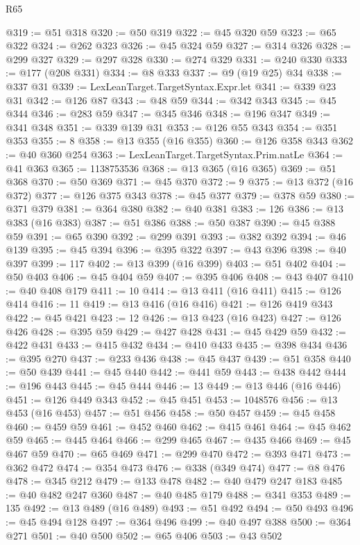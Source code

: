 \begin{lexlean}{R65}
\begin{coremodule}
@319 := @51 @318
@320 := @50 @319
@322 := @45 @320 @59
@323 := @65 @322
@324 := @262 @323
@326 := @45 @324 @59
@327 := @314 @326
@328 := @299 @327
@329 := @297 @328
@330 := @274 @329
@331 := @240 @330
@333 := @177 (@208 @331)
@334 := @8 @333
@337 := @9 (@19 @25) @34
@338 := @337 @31
@339 := LexLeanTarget.TargetSyntax.Expr.let
@341 := @339 @23 @31
@342 := @126 @87
@343 := @48 @59
@344 := @342 @343
@345 := @45 @344
@346 := @283 @59
@347 := @345 @346
@348 := @196 @347
@349 := @341 @348
@351 := @339 @139 @31
@353 := @126 @55 @343
@354 := @351 @353
@355 := 8
@358 := @13 @355 (@16 @355)
@360 := @126 @358 @343
@362 := @40 @360 @254
@363 := LexLeanTarget.TargetSyntax.Prim.natLe
@364 := @41 @363
@365 := 1138753536
@368 := @13 @365 (@16 @365)
@369 := @51 @368
@370 := @50 @369
@371 := @45 @370
@372 := 9
@375 := @13 @372 (@16 @372)
@377 := @126 @375 @343
@378 := @45 @377
@379 := @378 @59
@380 := @371 @379
@381 := @364 @380
@382 := @40 @381
@383 := 126
@386 := @13 @383 (@16 @383)
@387 := @51 @386
@388 := @50 @387
@390 := @45 @388 @59
@391 := @65 @390
@392 := @299 @391
@393 := @382 @392
@394 := @46 @139
@395 := @45 @394
@396 := @395 @322
@397 := @43 @396
@398 := @40 @397
@399 := 117
@402 := @13 @399 (@16 @399)
@403 := @51 @402
@404 := @50 @403
@406 := @45 @404 @59
@407 := @395 @406
@408 := @43 @407
@410 := @40 @408 @179
@411 := 10
@414 := @13 @411 (@16 @411)
@415 := @126 @414
@416 := 11
@419 := @13 @416 (@16 @416)
@421 := @126 @419 @343
@422 := @45 @421
@423 := 12
@426 := @13 @423 (@16 @423)
@427 := @126 @426
@428 := @395 @59
@429 := @427 @428
@431 := @45 @429 @59
@432 := @422 @431
@433 := @415 @432
@434 := @410 @433
@435 := @398 @434
@436 := @395 @270
@437 := @233 @436
@438 := @45 @437
@439 := @51 @358
@440 := @50 @439
@441 := @45 @440
@442 := @441 @59
@443 := @438 @442
@444 := @196 @443
@445 := @45 @444
@446 := 13
@449 := @13 @446 (@16 @446)
@451 := @126 @449 @343
@452 := @45 @451
@453 := 1048576
@456 := @13 @453 (@16 @453)
@457 := @51 @456
@458 := @50 @457
@459 := @45 @458
@460 := @459 @59
@461 := @452 @460
@462 := @415 @461
@464 := @45 @462 @59
@465 := @445 @464
@466 := @299 @465
@467 := @435 @466
@469 := @45 @467 @59
@470 := @65 @469
@471 := @299 @470
@472 := @393 @471
@473 := @362 @472
@474 := @354 @473
@476 := @338 (@349 @474)
@477 := @8 @476
@478 := @345 @212
@479 := @133 @478
@482 := @40 @479 @247 @183
@485 := @40 @482 @247 @360
@487 := @40 @485 @179
@488 := @341 @353
@489 := 135
@492 := @13 @489 (@16 @489)
@493 := @51 @492
@494 := @50 @493
@496 := @45 @494 @128
@497 := @364 @496
@499 := @40 @497 @388
@500 := @364 @271
@501 := @40 @500
@502 := @65 @406
@503 := @43 @502

\end{coremodule}
\end{lexlean}
